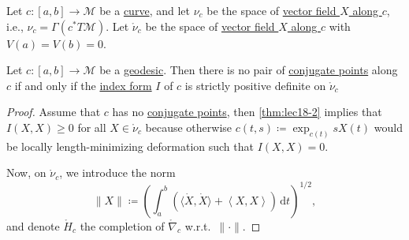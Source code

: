 Let \(c\colon [a, b] \to \mathcal{M} \) be a \hyperref[def:curve]{curve}, and let \(\nu _c\) be the space of \hyperref[def:vector-field-along-curve]{vector field \(X\) along \(c\)}, i.e., \(\nu _c = \Gamma (c^{\ast} T \mathcal{M} )\). Let \(\mathring{\nu }_c\) be the space of \hyperref[def:vector-field-along-curve]{vector field \(X\) along \(c\)} with \(V(a) = V(b) = 0\).

\begin{lemma}
	Let \(c\colon [a, b] \to \mathcal{M} \) be a \hyperref[def:geodesic]{geodesic}. Then there is no pair of \hyperref[def:conjugate-point]{conjugate points} along \(c\) if and only if the \hyperref[def:index-form]{index form} \(I\) of \(c\) is strictly positive definite on \(\mathring{\nu}_c\)
\end{lemma}
\begin{proof}
	Assume that \(c\) has no \hyperref[def:conjugate-point]{conjugate points}, then \autoref{thm:lec18-2} implies that
	\(I(X, X) \geq 0\) for all \(X \in \mathring{\nu }_c\) because otherwise \(c(t, s)\coloneqq \exp _{c(t)} s X(t)\) would be locally length-minimizing deformation such that \(I(X, X) = 0\).

	Now, on \(\mathring{\nu }_c\), we introduce the norm
	\[
		\lVert X \rVert \coloneqq \left( \int_{a}^{b} \left( \langle \dot{X} , \dot{X} \rangle + \left\langle X, X \right\rangle  \right)  \,\mathrm{d}t \right) ^{1 / 2},
	\]
	and denote \(\mathring{H}_c\) the completion of \(\mathring{\nabla }_c\) w.r.t.\ \(\lVert \cdot \rVert \).
\end{proof}